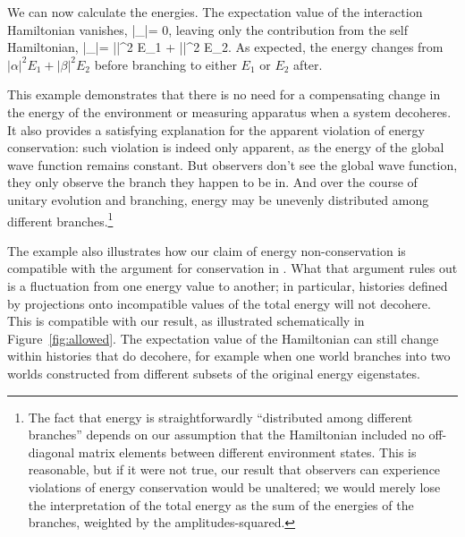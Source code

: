 \documentclass[12pt,aps,prd,onecolumn,nofootinbib,notitlepage]{revtex4-1}
\begin{document}
We can now calculate the energies.
The expectation value of the interaction Hamiltonian vanishes,
\be
  \langle\psi |\ham_|\psi\rangle = 0,
\ee
leaving only the contribution from the self Hamiltonian,
\be
  \langle\psi |\ham_|\psi\rangle = |\alpha|^2 E_1 + |\beta|^2 E_2.
\ee
As expected, the energy changes from $|\alpha|^2 E_1 + |\beta|^2 E_2$ before branching to either $E_1$ or $E_2$ after.

This example demonstrates that there is no need for a compensating change in the energy of the environment or measuring apparatus when a system decoheres.
It also provides a satisfying explanation for the apparent violation of energy conservation: such violation is indeed only apparent, as the energy of the global wave function remains constant.
But observers don't see the global wave function, they only observe the branch they happen to be in.
And over the course of unitary evolution and branching, energy may be unevenly distributed among different branches.\footnote{The fact that energy is straightforwardly ``distributed among different branches'' depends on our assumption that the Hamiltonian included no off-diagonal matrix elements between different environment states. This is reasonable, but if it were not true, our result that observers can experience violations of energy conservation would be unaltered; we would merely lose the interpretation of the total energy as the sum of the energies of the branches, weighted by the amplitudes-squared.}

The example also illustrates how our claim of energy non-conservation is compatible with the argument for conservation in \cite{griffiths,hartle1995conservation}.
What that argument rules out is a fluctuation from one energy value to another; in particular, histories defined by projections onto incompatible values of the total energy will not decohere.
This is compatible with our result, as illustrated schematically in Figure~\ref{fig:allowed}.
The expectation value of the Hamiltonian can still change within histories that do decohere, for example when one world branches into two worlds constructed from different subsets of the original energy eigenstates.
\end{document}

